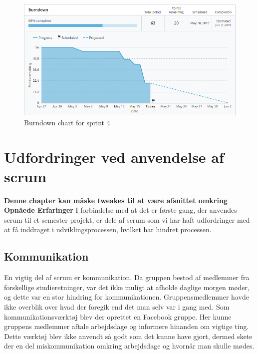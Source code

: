 	\begin{figure}[H]
		\centering
		\includegraphics[width=\textwidth]{Projektgennemfoerelse/images/burndown4}
		\caption{Burndown chart for sprint 4}
		\label{ref:Burndown4}
	\end{figure}
	



\chapter{Udfordringer ved anvendelse af scrum}
\textbf{Denne chapter kan måske tweakes til at være afsnittet omkring Opnåede Erfaringer} \newline
I forbindelse med at det er første gang, der anvendes scrum til et semester projekt, er dele af scrum som vi har haft udfordringer med at få inddraget i udviklingsprocessen, hvilket har hindret processen. \newline

\section{Kommunikation}
En vigtig del af scrum er kommunikation. Da gruppen bestod af medlemmer fra forskellige studieretninger, var det ikke muligt at afholde daglige morgen møder, og dette var en stor hindring for kommunikationen. Gruppensmedlemmer havde ikke overblik over hvad der foregik end det man selv var i gang med. Som kommunikationsværktøj blev der oprettet en Facebook gruppe. Her kunne gruppens medlemmer aftale arbejdsdage og informere hinanden om vigtige ting. Dette værktøj blev ikke anvendt så godt som det kunne have gjort, dermed skete der en del miskommunikation omkring arbejdsdage og hvornår man skulle mødes. \par

